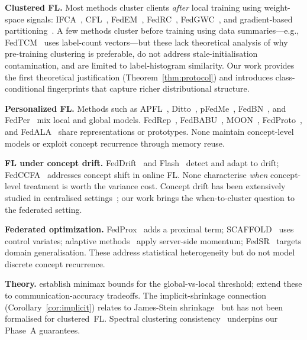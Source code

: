 \documentclass[11pt]{article}
\begin{document}
\textbf{Clustered FL.}
Most methods cluster clients \emph{after} local training using weight-space signals:
IFCA~\citep{ghosh2020efficient}, CFL~\citep{sattler2021clustered}, FedEM~\citep{marfoq2021federated}, FedRC~\citep{guo2024fedrc}, FedGWC~\citep{licciardi2025fedgwc}, and gradient-based partitioning~\citep{kim2024gradient}.
A few methods cluster before training using data summaries---e.g., FedTCM~\citep{fedtcm2023} uses label-count vectors---but these lack theoretical analysis of why pre-training clustering is preferable, do not address stale-initialisation contamination, and are limited to label-histogram similarity.
Our work provides the first theoretical justification (Theorem~\ref{thm:protocol}) and introduces class-conditional fingerprints that capture richer distributional structure.

\textbf{Personalized FL.}
Methods such as APFL~\citep{deng2020adaptive}, Ditto~\citep{li2021ditto}, pFedMe~\citep{t2020personalized}, FedBN~\citep{li2021fedbn}, and FedPer~\citep{arivazhagan2019fedper} mix local and global models.
FedRep~\citep{collins2021exploiting}, FedBABU~\citep{oh2022fedbabu}, MOON~\citep{li2021model}, FedProto~\citep{tan2022fedproto}, and FedALA~\citep{zhang2023fedala} share representations or prototypes.
None maintain concept-level models or exploit concept recurrence through memory reuse.

\textbf{FL under concept drift.}
FedDrift~\citep{jothimurugesan2023federated} and Flash~\citep{panchal2023flash} detect and adapt to drift; FedCCFA~\citep{chen2024fedccfa} addresses concept shift in online FL.
None characterise \emph{when} concept-level treatment is worth the variance cost.
Concept drift has been extensively studied in centralised settings~\citep{gama2014survey, lu2018learning}; our work brings the when-to-cluster question to the federated setting.

\textbf{Federated optimization.}
FedProx~\citep{li2020federated} adds a proximal term; SCAFFOLD~\citep{karimireddy2020scaffold} uses control variates; adaptive methods~\citep{reddi2021adaptive, wu2023faster} apply server-side momentum; FedSR~\citep{nguyen2022fedsr} targets domain generalisation.
These address statistical heterogeneity but do not model discrete concept recurrence.

\textbf{Theory.}
\citet{chen2023minimax} establish minimax bounds for the global-vs-local threshold; \citet{yu2025minimax} extend these to communication-accuracy tradeoffs.
The implicit-shrinkage connection (Corollary~\ref{cor:implicit}) relates to James-Stein shrinkage~\citep{james1961estimation, efron1973stein, fedstein2024} but has not been formalised for clustered~FL.
Spectral clustering consistency~\citep{lei2015consistency, loffler2021optimality, von2007tutorial} underpins our Phase~A guarantees.
\end{document}
